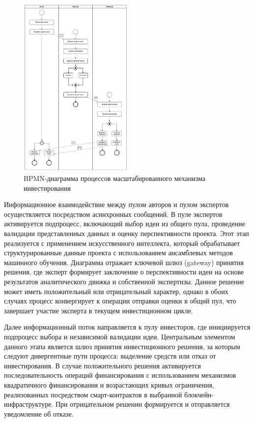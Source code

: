 \documentclass[
    14pt,
    specialist,
    candidate, %
    subf, %
    href,
    dotsinheaders=false
]{disser}
\begin{document}
\begin{figure}[H]
  \centering
  \includegraphics[width=0.5\textwidth]{./assets/bpmn.drawio.png}
  \caption{BPMN-диаграмма процессов масштабированного механизма инвестирования}
  \label{fig:bpmn}
\end{figure}

Информационное взаимодействие между пулом авторов и пулом экспертов осуществляется посредством асинхронных сообщений. В пуле экспертов активируется подпроцесс, включающий выбор идеи из общего пула, проведение валидации представленных данных и оценку перспективности проекта. Этот этап реализуется с применением искусственного интеллекта, который обрабатывает структурированные данные проекта с использованием ансамблевых методов машинного обучения. Диаграмма отражает ключевой шлюз (gateway) принятия решения, где эксперт формирует заключение о перспективности идеи на основе результатов аналитического движка и собственной экспертизы. Данное решение может иметь положительный или отрицательный характер, однако в обоих случаях процесс конвергирует к операции отправки оценки в общий пул, что завершает участие эксперта в текущем инвестиционном цикле.

Далее информационный поток направляется к пулу инвесторов, где инициируется подпроцесс выбора и независимой валидации идеи. Центральным элементом данного этапа является шлюз принятия инвестиционного решения, за которым следуют дивергентные пути процесса: выделение средств или отказ от инвестирования. В случае положительного решения активируется последовательность операций финансирования с использованием механизмов квадратичного финансирования и возрастающих кривых ограничения, реализованных посредством смарт-контрактов в выбранной блокчейн-инфраструктуре. При отрицательном решении формируется и отправляется уведомление об отказе.
\end{document}
